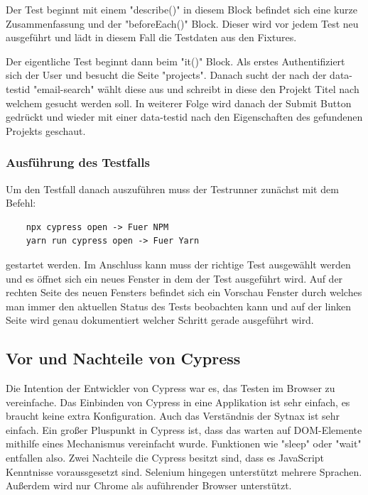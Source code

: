 Der Test beginnt mit einem "describe()" in diesem Block befindet sich eine kurze Zusammenfassung und der "beforeEach()" Block. Dieser wird vor jedem Test neu ausgeführt und lädt in diesem Fall die Testdaten aus den Fixtures.

Der eigentliche Test beginnt dann beim "it()" Block. Als erstes Authentifiziert sich der User und besucht die Seite "projects". Danach sucht der nach der data-testid "email-search" wählt diese aus und schreibt in diese den Projekt Titel nach welchem gesucht werden soll. In weiterer Folge wird danach der Submit Button gedrückt und wieder mit einer data-testid nach den Eigenschaften des gefundenen Projekts geschaut.

\subsubsection{Ausführung des Testfalls}

Um den Testfall danach auszuführen muss der Testrunner zunächst mit dem Befehl:

\begin{lstlisting}
    npx cypress open -> Fuer NPM
    yarn run cypress open -> Fuer Yarn
\end{lstlisting}

gestartet werden.
Im Anschluss kann muss der richtige Test ausgewählt werden und es öffnet sich ein neues Fenster in dem der Test ausgeführt wird. Auf der rechten Seite des neuen Fensters befindet sich ein Vorschau Fenster durch welches man immer den aktuellen Status des Tests beobachten kann und auf der linken Seite wird genau dokumentiert welcher Schritt gerade ausgeführt wird.

\subsection{Vor und Nachteile von Cypress}

Die Intention der Entwickler von Cypress war es, das Testen im Browser zu vereinfache. Das Einbinden von Cypress in eine Applikation ist sehr einfach, es braucht keine extra Konfiguration. Auch das Verständnis der Sytnax ist sehr einfach. Ein großer Pluspunkt in Cypress ist, dass das warten auf DOM-Elemente mithilfe eines Mechanismus vereinfacht wurde. Funktionen wie "sleep" oder "wait" entfallen also. 
Zwei Nachteile die Cypress besitzt sind, dass es JavaScript Kenntnisse voraussgesetzt sind. Selenium hingegen unterstützt mehrere Sprachen. Außerdem wird nur Chrome als auführender Browser unterstützt.












